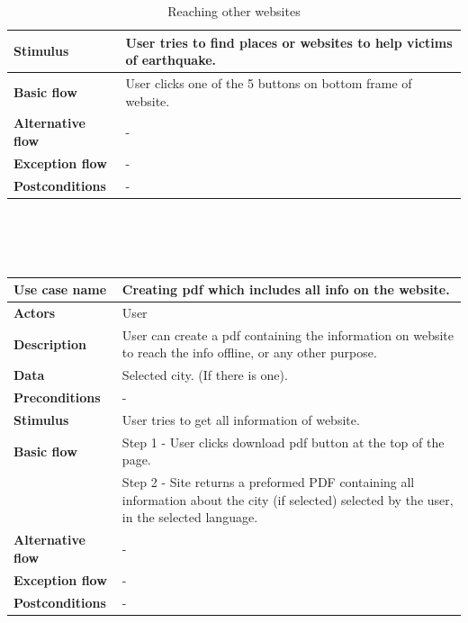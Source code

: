 \begin{center}
\begin{table}[H]
\begin{tabular}{| m{3cm}| m{10cm} |}
            \hline
            \textbf{Stimulus} & User tries to find places or websites to help victims of earthquake. \\
            \hline
            \textbf{Basic flow} & User clicks one of the 5 buttons on bottom frame of website.\\        
            \hline
            \textbf{Alternative flow} & - \\
            \hline
            \textbf{Exception flow} &  -\\
            \hline
            \textbf{Postconditions} & -\\
            \hline
        \end{tabular}
        \caption[Reaching other websites]{Reaching other websites}
    \end{table}
    ~\\~\\~\\
    \begin{table}[H]
        \begin{tabular}{| m{3cm}| m{10cm} |}
            \hline
            \textbf{Use case name} & Creating pdf which includes all info on the website.  \\
            \hline
            \textbf{Actors} & User\\
            \hline
            \textbf{Description} & User can create a pdf containing the information on website to reach the info offline, or any other purpose.\\
            \hline
            \textbf{Data} & Selected city. (If there is one). \\
            \hline
            \textbf{Preconditions} & - \\
            \hline
            \textbf{Stimulus} & User tries to get all information of website. \\
            \hline
            \textbf{Basic flow} & Step 1 - User clicks download pdf button at the top of the page.\\
                                & Step 2 - Site returns a preformed PDF containing all information about the city (if selected) selected by the user, in the selected language.\\
            \hline
            \textbf{Alternative flow} & - \\
            \hline
            \textbf{Exception flow} &  -\\
            \hline
            \textbf{Postconditions} & -\\

\end{tabular}
\end{table}
\end{center}
